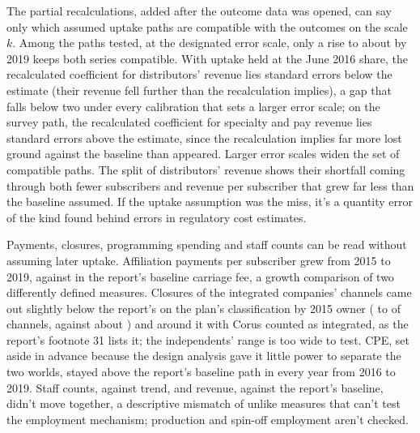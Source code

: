 The partial recalculations, added after the outcome data was opened, can say only which assumed uptake paths are compatible with the outcomes on the scale \(k\). Among the paths tested, at the designated error scale, only a rise to about \lttvMorrisonUptake{} by 2019 keeps both series compatible. With uptake held at the June 2016 share, the recalculated coefficient for distributors' revenue lies \lttvKPredBDUObsUptakeSEs{} standard errors below the estimate (their revenue fell further than the recalculation implies), a gap that falls below two under every calibration that sets a larger error scale; on the survey path, the recalculated coefficient for specialty and pay revenue lies \lttvKPredSpecSurveySEs{} standard errors above the estimate, since the recalculation implies far more lost ground against the baseline than appeared. Larger error scales widen the set of compatible paths. The split of distributors' revenue shows their shortfall coming through both fewer subscribers and revenue per subscriber that grew far less than the baseline assumed. If the uptake assumption was the miss, it's a quantity error of the kind \textcite[297]{harrington2000accuracy} found behind errors in regulatory cost estimates.

Payments, closures, programming spending and staff counts can be read without assuming later uptake. Affiliation payments per subscriber grew \lttvPerSubGrowth{} from 2015 to 2019, against \lttvBaseFeeGrowth{} in the report's baseline carriage fee, a growth comparison of two differently defined measures. Closures of the integrated companies' channels came out slightly below the report's \lttvReportClosuresVI{} on the plan's classification by 2015 owner (\lttvClosVIPlanClosed{} to \lttvClosVIPlanUpper{} of \lttvClosVIPlanN{} channels, against about \lttvClosVIPlanImplied{}) and around it with Corus counted as integrated, as the report's footnote 31 lists it; the independents' range is too wide to test. CPE, set aside in advance because the design analysis gave it little power to separate the two worlds, stayed above the report's baseline path in every year from 2016 to 2019. Staff counts, against trend, and revenue, against the report's baseline, didn't move together, a descriptive mismatch of unlike measures that can't test the employment mechanism; production and spin-off employment aren't checked.

